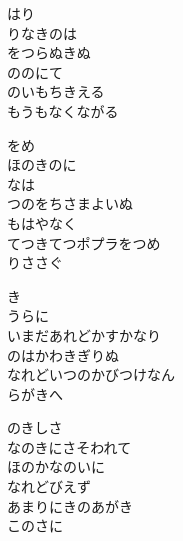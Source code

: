 \documentclass[10pt,b5j]{tarticle} %
\begin{document}
\vspace{1.5em} %
\newcommand{\linespace}{0.5em} %
\newcommand{\blocksize}{0.5\hsize} %
\begin{enumerate} %
    \begin{minipage}[c]{\blocksize}
    
        \vspace{\linespace}
        \item
        はり\\
        りなきのは\\
        をつらぬきぬ\\
        ののにて\\
        のいもちきえる\\
        もうもなくながる
        
        \vspace{\linespace}
        \item
        をめ\\
        ほのきのに\\
        なは\\
        つのをちさまよいぬ\\
        もはやなく\\
        てつきてつポプラをつめ\\
        りささぐ
        
        \vspace{\linespace}
        \item
        き\\
        うらに\\
        いまだあれどかすかなり\\
        のはかわきぎりぬ\\
        なれどいつのかびつけなん\\
        らがきへ
        
        \vspace{\linespace}
        \item
        のきしさ\\
        なのきにさそわれて\\
        ほのかなのいに\\
        なれどびえず\\
        あまりにきのあがき\\
        このさに
        

\end{minipage}
\end{enumerate}
\end{document}

